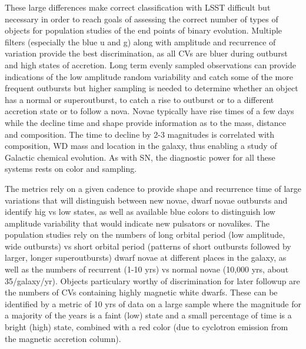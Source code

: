 These large differences make correct classification with LSST difficult
but necessary in order to reach goals of assessing the correct number
of types of objects for population studies of the end points of
binary evolution. Multiple filters (especially the blue u and g) 
along with amplitude and recurrence of variation provide the best
discrimination, as all CVs are bluer during outburst and high states of
accretion. Long term evenly sampled observations can provide indications
of the low amplitude random variability and catch some of the more frequent
outbursts but higher sampling is needed to determine whether an object
has a normal or superoutburst, to catch a rise to outburst or to a
different accretion state or to follow a nova. Novae typically
have rise times of a few days while the decline time and shape provide
information as to the mass, distance and composition. The time to decline
by 2-3 magnitudes is correlated with composition, WD mass and location in
the galaxy, thus enabling a study of Galactic chemical evolution.  As with SN, 
the diagnostic power for all these systems rests on color and sampling.   

The metrics rely on a given cadence to provide shape and recurrence time
of large variations that will distinguish between new novae, dwarf novae
outbursts and identify hig vs low states, as well as available blue colors to 
distinguish low amplitude variability that would indicate new pulsators or 
novalikes. The population studies rely on the numbers of long orbital period 
(low amplitude, wide outbursts) vs short orbital period (patterns of short 
outbursts followed by larger, longer superoutbursts) dwarf novae at different 
places in the galaxy, as well as the numbers of recurrent (1-10 yrs) vs normal 
novae (10,000 yrs, about 35/galaxy/yr). Objects particulary worthy of 
discrimination for later followup are the numbers of CVs containing highly 
magnetic white dwarfs. These can be identified by a metric of 10 yrs of data on
a large sample where the magnitude for a majority of the years is a faint (low)
state and a small percentage of time is a bright (high) state, combined with a 
red color (due to cyclotron emission from the magnetic accretion column).
